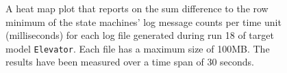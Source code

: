 \begin{figure}[htbp]
\centering
\begin{minipage}{1\textwidth}
  \centering
\end{minipage}
\caption{A heat map plot that reports on the sum difference to the row minimum of the state machines' log message counts per time unit (milliseconds) for each log file generated during run 18 of target model \texttt{Elevator}. Each file has a maximum size of 100MB. The results have been measured over a time span of 30 seconds.}
\label{figure:throughput_difference_elevator_18}
\end{figure}